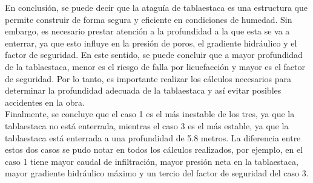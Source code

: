 \documentclass{article}
\begin{document}
En conclusión, se puede decir que la ataguía de tablaestaca es una estructura que permite construir de forma segura y eficiente en condiciones de humedad. Sin embargo, es necesario prestar atención a la profundidad a la que esta se va a enterrar, ya que esto influye en la presión de poros, el gradiente hidráulico y el factor de seguridad. En este sentido, se puede concluir que a mayor profundidad de la tablaestaca, menor es el riesgo de falla por licuefacción y mayor es el factor de seguridad. Por lo tanto, es importante realizar los cálculos necesarios para determinar la profundidad adecuada de la tablaestaca y así evitar posibles accidentes en la obra.\\

Finalmente, se concluye que el caso 1 es el más inestable de los tres, ya que la tablaestaca no está enterrada, mientras el caso 3 es el más estable, ya que la tablaestaca está enterrada a una profundidad de 5.8 metros. La diferencia entre estos dos casos se pudo notar en todos los cálculos realizados, por ejemplo, en el caso 1 tiene mayor caudal de infiltración, mayor presión neta en la tablaestaca, mayor gradiente hidráulico máximo y un tercio del factor de seguridad del caso 3.
\end{document}
